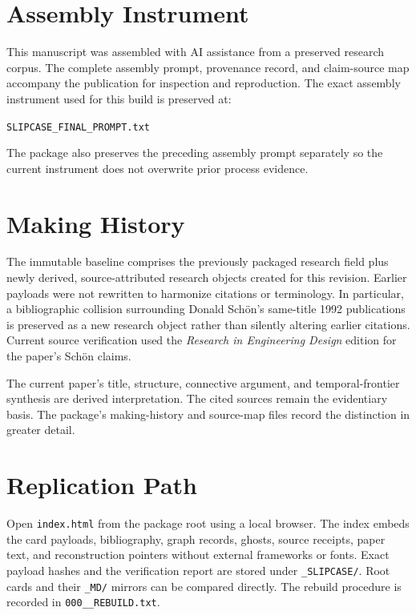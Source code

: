 \documentclass[11pt]{article}
\begin{document}
\clearpage
\appendix
\section{Assembly Instrument}

This manuscript was assembled with AI assistance from a preserved research corpus. The complete assembly prompt, provenance record, and claim-source map accompany the publication for inspection and reproduction. The exact assembly instrument used for this build is preserved at:

\begin{center}
\texttt{SLIPCASE\_FINAL\_PROMPT.txt}
\end{center}

The package also preserves the preceding assembly prompt separately so the current instrument does not overwrite prior process evidence.

\section{Making History}

The immutable baseline comprises the previously packaged research field plus newly derived, source-attributed research objects created for this revision. Earlier payloads were not rewritten to harmonize citations or terminology. In particular, a bibliographic collision surrounding Donald Sch\"on's same-title 1992 publications is preserved as a new research object rather than silently altering earlier citations. Current source verification used the \emph{Research in Engineering Design} edition for the paper's Sch\"on claims.

The current paper's title, structure, connective argument, and temporal-frontier synthesis are derived interpretation. The cited sources remain the evidentiary basis. The package's making-history and source-map files record the distinction in greater detail.

\section{Replication Path}

Open \texttt{index.html} from the package root using a local browser. The index embeds the card payloads, bibliography, graph records, ghosts, source receipts, paper text, and reconstruction pointers without external frameworks or fonts. Exact payload hashes and the verification report are stored under \texttt{\_SLIPCASE/}. Root cards and their \texttt{\_MD/} mirrors can be compared directly. The rebuild procedure is recorded in \texttt{000\_\_REBUILD.txt}.
\end{document}

